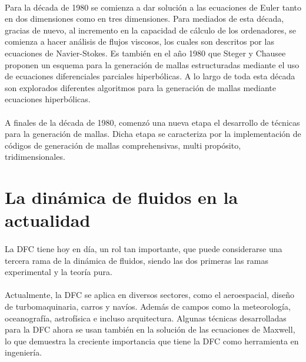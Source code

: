 \documentclass[letterpaper, openright, 12pt]{book}
\begin{document}
    \paragraph*{}
    Para la década de 1980 se comienza a dar solución a las ecuaciones de Euler
    tanto en dos dimensiones como en tres dimensiones. Para mediados de esta
    década, gracias de nuevo, al incremento en la capacidad de cálculo de los
    ordenadores, se comienza a hacer análisis de flujos viscosos, los cuales
    son descritos por las ecuaciones de Navier-Stokes.\cite{blazek} Es también
    en el año 1980 que Steger y Chausee proponen un esquema para la generación
    de mallas estructuradas mediante el uso de ecuaciones diferenciales
    parciales hiperbólicas. A lo largo de toda esta década son explorados
    diferentes algoritmos para la generación de mallas mediante ecuaciones
    hiperbólicas.

    \paragraph*{}
    A finales de la década de 1980, comenzó una nueva etapa el desarrollo de
    técnicas para la generación de mallas. Dicha etapa se caracteriza por la
    implementación de códigos de generación de mallas comprehensivas, multi
    propósito, tridimensionales.\cite{liseikin1999grid}

    \section{La dinámica de fluidos en la actualidad}
    \paragraph*{}
    La DFC tiene hoy en día, un rol tan importante, que puede considerarse una
    tercera rama de la dinámica de fluidos, siendo las dos primeras las ramas
    experimental y la teoría pura.\cite{anderson-yotros}

    \paragraph*{}
    Actualmente, la DFC se aplica en diversos sectores, como el aeroespacial,
    diseño de turbomaquinaria, carros y navíos. Además de campos como la
    meteorología, oceanografía, astrofísica e incluso arquitectura. Algunas
    técnicas desarrolladas para la DFC ahora se usan también en la solución de
    las ecuaciones de Maxwell, lo que demuestra la creciente importancia
    que tiene la DFC como herramienta en ingeniería.\cite{blazek}
\end{document}
